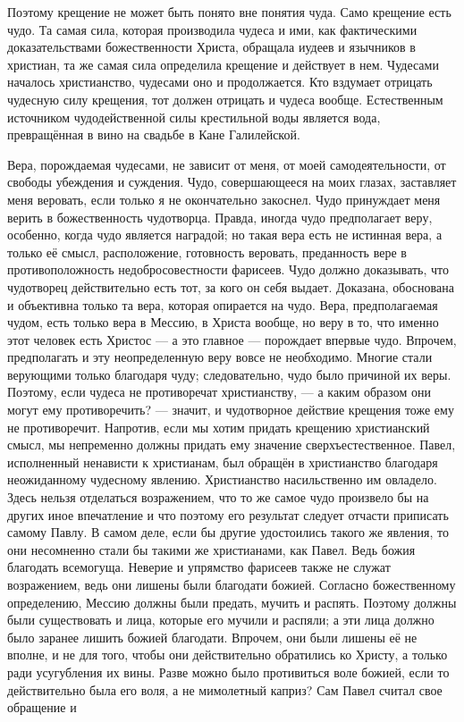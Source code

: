 \documentclass[12pt,oneside]{book}
\begin{document}
Поэтому крещение не может быть понято вне понятия чуда. Само крещение есть чудо. Та самая сила, которая производила чудеса и ими, как фактическими доказательствами божественности Христа, обращала иудеев и язычников в христиан, та же самая сила определила крещение и действует в нем. Чудесами началось христианство, чудесами оно и продолжается. Кто вздумает отрицать чудесную силу крещения, тот должен отрицать и чудеса вообще. Естественным источником чудодейственной силы крестильной воды является вода, превращённая в вино на свадьбе в Кане Галилейской.

Вера, порождаемая чудесами, не зависит от меня, от моей самодеятельности, от свободы убеждения и суждения. Чудо, совершающееся на моих глазах, заставляет меня веровать, если только я не окончательно закоснел. Чудо принуждает меня верить в божественность чудотворца\dag\let\svthefootnote\thefootnote\let\thefootnote\relax{}\let\thefootnote\svthefootnote. Правда, иногда чудо предполагает веру, особенно, когда чудо является наградой; но такая вера есть не истинная вера, а только её смысл, расположение, готовность веровать, преданность вере в противоположность недобросовестности фарисеев. Чудо должно доказывать, что чудотворец действительно есть тот, за кого он себя выдает. Доказана, обоснована и объективна только та вера, которая опирается на чудо. Вера, предполагаемая чудом, есть только вера в Мессию, в Христа вообще, но веру в то, что именно этот человек есть Христос --- а это главное --- порождает впервые чудо. Впрочем, предполагать и эту неопределенную веру вовсе не необходимо. Многие стали верующими только благодаря чуду; следовательно, чудо было причиной их веры. Поэтому, если чудеса не противоречат христианству, --- а каким образом они могут ему противоречить? --- значит, и чудотворное действие крещения тоже ему не противоречит. Напротив, если мы хотим придать крещению христианский смысл, мы непременно должны придать ему значение сверхъестественное. Павел, исполненный ненависти к христианам, был обращён в христианство благодаря неожиданному чудесному явлению. Христианство насильственно им овладело. Здесь нельзя отделаться возражением, что то же самое чудо произвело бы на других иное впечатление и что поэтому его результат следует отчасти приписать самому Павлу. В самом деле, если бы другие удостоились такого же явления, то они несомненно стали бы такими же христианами, как Павел. Ведь божия благодать всемогуща. Неверие и упрямство фарисеев также не служат возражением, ведь они лишены были благодати божией. Согласно божественному определению, Мессию должны были предать, мучить и распять. Поэтому должны были существовать и лица, которые его мучили и распяли; а эти лица должно было заранее лишить божией благодати. Впрочем, они были лишены её не вполне, и не для того, чтобы они действительно обратились ко Христу, а только ради усугубления их вины. Разве можно было противиться воле божией, если то действительно была его воля, а не мимолетный каприз? Сам Павел считал свое обращение и 
\end{document}
